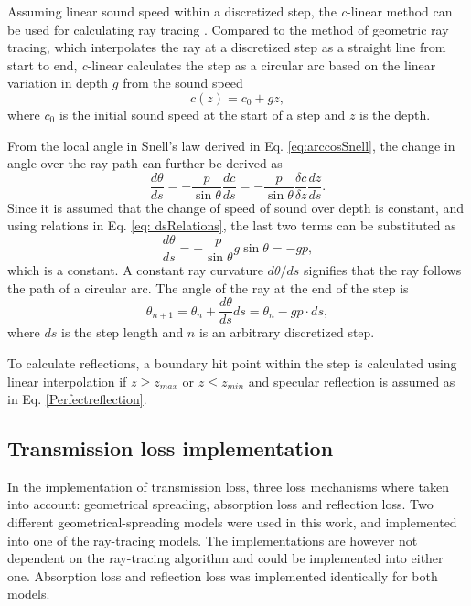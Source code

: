 \documentclass[fleqn]{jaes}
\begin{document}
Assuming linear sound speed within a discretized step, the \textit{c}-linear method can be used for calculating ray tracing \cite{Jensen}. Compared to the method of geometric ray tracing, which interpolates the ray at a discretized step as a straight line from start to end, \textit{c}-linear calculates the step as a circular arc based on the linear variation in depth $g$ from the sound speed
\begin{equation}
c(z) = c_0+gz,
\label{eq:linearSpeed}
\end{equation}
where $c_0$ is the initial sound speed at the start of a step and $z$ is the depth.

From the local angle in Snell's law derived in Eq. \ref{eq:arccosSnell}, the change in angle over the ray path can further be derived as
\begin{equation}
    \frac{d\theta}{ds}= -\frac{p}{\sin\theta}\frac{dc}{ds} = -\frac{p}{\sin\theta}\frac{\delta c}{\delta z} \frac{dz}{ds}.
\end{equation}
Since it is assumed that the change of speed of sound over depth is constant, and using relations in Eq. \ref{eq: dsRelations}, the last two terms can be substituted as
\begin{equation}
    \frac{d\theta}{ds} = -\frac{p}{\sin\theta}g \sin\theta = -gp,
\end{equation}
which is a constant. A constant ray curvature $d\theta/ds$ signifies that the ray follows the path of a circular arc. The angle of the ray at the end of the step is
\begin{equation}
    \theta_{n+1}=\theta_n+\frac{d\theta}{ds}ds=\theta_n-gp \cdot ds,
\end{equation}
where $ds$ is the step length and $n$ is an arbitrary discretized step.

To calculate reflections, a boundary hit point within the step is calculated using linear interpolation if $z\geq z_{max}$ or $z\leq z_{min}$ and specular reflection is assumed as in Eq. \ref{Perfectreflection}.

\subsection{Transmission loss implementation}
In the implementation of transmission loss, three loss mechanisms where taken into account: geometrical spreading, absorption loss and reflection loss. Two different geometrical-spreading models were used in this work, and implemented into one of the ray-tracing models. The implementations are however not dependent on the ray-tracing algorithm and could be implemented into either one. Absorption loss and reflection loss was implemented identically for both models. 
\end{document}
